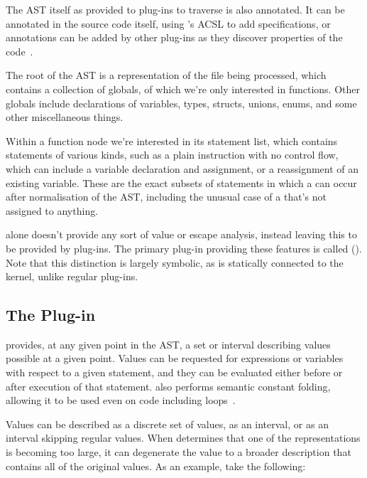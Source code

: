 The AST itself as provided to plug-ins to traverse is also annotated. It can be annotated in the source code itself, using 's ACSL to add specifications, or annotations can be added by other plug-ins as they discover properties of the code~\cite{framaplug}.

The root of the AST is a representation of the file being processed, which contains a collection of globals, of which we're only interested in functions. Other globals include declarations of variables, types, structs, unions, enums, and some other miscellaneous things.

Within a function node we're interested in its statement list, which contains statements of various kinds, such as a plain instruction with no control flow, which can include a variable declaration and assignment, or a reassignment of an existing variable. These are the exact subsets of statements in which a \malloc{} can occur after normalisation of the AST, including the unusual case of a \malloc{} that's not assigned to anything.

 alone doesn't provide any sort of value or escape analysis, instead leaving this to be provided by plug-ins. The primary plug-in providing these features is called  (). Note that this distinction is largely symbolic, as  is statically connected to the  kernel, unlike regular plug-ins.

\subsection{The  Plug-in} \label{EVA}

 provides, at any given point in the AST, a set or interval describing values possible at a given point. Values can be requested for expressions or variables with respect to a given statement, and they can be evaluated either before or after execution of that statement.  also performs semantic constant folding, allowing it to be used even on code including loops~\cite{framaeva}.

Values can be described as a discrete set of values, as an interval, or as an interval skipping regular values. When  determines that one of the representations is becoming too large, it can degenerate the value to a broader description that contains all of the original values. As an example, take the following:

